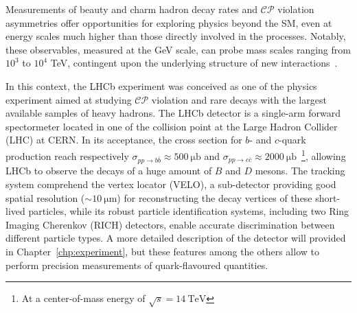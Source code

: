 Measurements of beauty and charm hadron decay rates and $\mathcal{CP}$ violation asymmetries offer opportunities for exploring physics beyond the SM, even at energy scales much higher than those directly involved in the processes. Notably, these observables, measured at the GeV scale, can probe mass scales ranging from $10^3$ to $10^4$ TeV, contingent upon the underlying structure of new interactions~\cite{Isidori_2010}. 

In this context, the LHCb experiment was conceived as one of the physics experiment aimed at studying $\mathcal{CP}$ violation and rare decays with the largest available samples of heavy hadrons. The LHCb detector is a single-arm forward spectormeter located in one of the collision point at the Large Hadron Collider (LHC) at CERN. In its acceptance, the cross section for $b$- and $c$-quark production reach respectively $\sigma_{pp\rightarrow b\bar{b}}\approx\SI{500}{\micro\barn}$ and $\sigma_{pp\rightarrow c\bar{c}}\approx\SI{2000}{\micro\barn}$~\cite{bCrossSection, Aaij:2057627}\footnote{At a center-of-mass energy of $\sqrt{s}=\SI{14}{\tera\eV}$}, allowing LHCb to observe the decays of a huge amount of $B$ and $D$ mesons. The tracking system comprehend the vertex locator (VELO), a sub-detector providing good spatial resolution ($\sim \SI{10}{\micro\meter}$) for reconstructing the decay vertices of these short-lived particles, while its robust particle identification systems, including two Ring Imaging Cherenkov (RICH) detectors, enable accurate discrimination between different particle types. A more detailed description of the detector will provided in Chapter~\ref{chp:experiment}, but these features among the others allow to perform precision measurements of quark-flavoured quantities.


